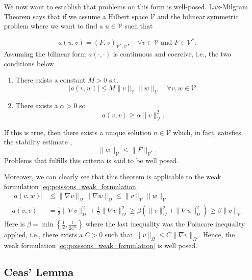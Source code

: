 We now want to establish that problems on this form is well-posed.
Lax-Milgram Theorem says that if we assume a Hilbert space $\mathcal{V} $ and the bilinear symmetric problem where we want to find a $u \in \mathcal{V} $  such that

\begin{equation*}
    a\left( u,v \right)  = \left( F, v \right) _{\mathcal{V} ^{*}, \mathcal{V} }, \quad \forall v \in  \mathcal{V} \text{ and } F \in \mathcal{V} ^{*}
.\end{equation*}
 Assuming the bilinear form $a\left( \cdot ,\cdot  \right) $  is continuous and coercive, i.e., the two conditions below.
\begin{enumerate}[label=\arabic*)]
    \item There exists a constant $M>0$ s.t. \[
    \left\lvert a\left( v,w \right)  \right\rvert \le M \| v \|_{ \mathcal{V}  }^{  } \| w \|_{ \mathcal{V}  }^{  }  \quad \forall v,w \in \mathcal{V}.
    \]
\item There exists a $\alpha  > 0$  so \[
a\left( v,v \right)  \ge  \alpha \| v \|_{ \mathcal{V}  }^{ 2 }.
\]
\end{enumerate}
If this is true, then there exists a unique solution $u \in \mathcal{V} $ which, in fact, satisfies the stability estimate \cite{manzoni2021optimal}, \[
\| w \|_{ \mathcal{V}   }^{  } \le  \| F \|_{ \mathcal{V} ^{*} }^{  }.
\]
Problems that fulfills this criteria is said to be well posed.

Moreover, we can clearly see that this theorem is applicable to the weak formulation \eqref{eq:poissons_weak_formulation}.
\[
\begin{split}
    \left\lvert a\left( v,w \right)  \right\rvert & \le \| \nabla v \|_{ \Omega  }^{  } \| \nabla w \|_{ \Omega  }^{  } \le \| v \|_{ \mathcal{V}  }^{  } \| w \|_{\mathcal{V}   }^{  }   \\
 a\left( v,v \right)    & = \frac{1}{2} \| \nabla v  \|_{ \Omega  }^{  2} + \frac{1}{2} \| \nabla v  \|_{ \Omega  }^{  2} \ge \beta \left( \| v \|_{\Omega   }^{ 2 }  + \| \nabla u \|_{\Omega   }^{ 2 } \right) \ge \beta \| v \|_{\mathcal{V}   }^{  }
\end{split}
\]
 Here is $\beta = \min_{} \left\{ \frac{1}{2}, \frac{1}{2C^{2}} \right\} $ where the last inequality was the Poincare inequality applied, i.e., there exists a $C>0$  such that $\| v \|_{ \Omega  }^{  } \le C  \| \nabla v \|_{\Omega   }^{  } $. Hence, the weak formulation \eqref{eq:poissons_weak_formulation} is well posed.

\subsection{Ceas' Lemma}%
\label{sub:ceas_lemma}


